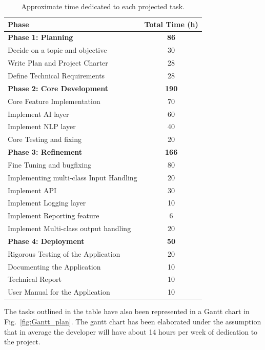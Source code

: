 \documentclass[a4paper, 11pt]{report}
\begin{document}
\begin{table}[ht!]
\centering
\begin{tabular}{|l|c|}
\hline
\textbf{Phase} & \textbf{Total Time (h)}  \\
\hline \hline
\textbf{Phase 1: Planning}  & \textbf{86}  \\
\hline
   Decide on a topic and objective  & 30  \\
\hline
   Write Plan and Project Charter  & 28  \\
\hline
  Define Technical Requirements  & 28  \\
\hline \hline
\textbf{Phase 2: Core Development}  & \textbf{190}  \\
\hline
   Core Feature Implementation  & 70  \\
\hline
   Implement AI layer  & 60  \\
\hline
   Implement NLP layer  & 40  \\
\hline
   Core Testing and fixing  & 20  \\
\hline \hline
\textbf{Phase 3: Refinement}  & \textbf{166}  \\
\hline
   Fine Tuning and bugfixing  & 80  \\
\hline
   Implementing multi-class Input Handling  & 20  \\
\hline
   Implement API  & 30  \\
\hline
   Implement Logging layer  & 10  \\
\hline
   Implement Reporting feature  & 6  \\
\hline
   Implement Multi-class output handling  & 20  \\
\hline \hline
\textbf{Phase 4: Deployment}  & \textbf{50}  \\
\hline
   Rigorous Testing of the Application  & 20  \\
\hline
   Documenting the Application  & 10  \\
\hline
   Technical Report  & 10  \\
\hline
   User Manual for the Application  & 10  \\
\hline
\end{tabular}
\caption{Approximate time dedicated to each projected task.}
\label{Tab:Effort Projection}
\end{table}

The tasks outlined in the table have also been represented in a Gantt chart in Fig.~\ref{fig:Gantt_plan}. The gantt chart has been elaborated under the assumption that in average the developer will have about 14 hours per week of dedication to the project.
\end{document}
